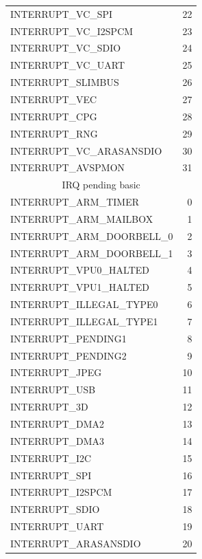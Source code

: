 \documentclass[12pt, svgnames]{book}
\begin{document}
\begin{centering}
{\begin{longtable}{|l | r |}
			 INTERRUPT\_VC\_SPI               &  22\\
			 INTERRUPT\_VC\_I2SPCM            &  23\\
			 INTERRUPT\_VC\_SDIO              &  24\\
			 INTERRUPT\_VC\_UART              &  25\\
			 INTERRUPT\_SLIMBUS              &  26\\
			 INTERRUPT\_VEC                  &  27\\
			 INTERRUPT\_CPG                  &  28\\
			 INTERRUPT\_RNG                  &  29\\
			 INTERRUPT\_VC\_ARASANSDIO        &  30\\
			 INTERRUPT\_AVSPMON              &  31\\
			 \hline
			\multicolumn{2}{|c|}{IRQ pending basic}\\
			\hline
			 INTERRUPT\_ARM\_TIMER            &  0\\
			 INTERRUPT\_ARM\_MAILBOX          &  1\\
			 INTERRUPT\_ARM\_DOORBELL\_0       &  2\\
			 INTERRUPT\_ARM\_DOORBELL\_1       &  3\\
			 INTERRUPT\_VPU0\_HALTED          &  4\\
			 INTERRUPT\_VPU1\_HALTED          &  5\\
			 INTERRUPT\_ILLEGAL\_TYPE0        &  6\\
			 INTERRUPT\_ILLEGAL\_TYPE1        &  7\\
			 INTERRUPT\_PENDING1             &  8\\
			 INTERRUPT\_PENDING2             &  9\\
			 INTERRUPT\_JPEG                 &  10\\
			 INTERRUPT\_USB                  &  11\\
			 INTERRUPT\_3D                   &  12\\
			 INTERRUPT\_DMA2                 &  13\\
			 INTERRUPT\_DMA3                 &  14\\
			 INTERRUPT\_I2C                  &  15\\
			 INTERRUPT\_SPI                  &  16\\
			 INTERRUPT\_I2SPCM               &  17\\
			 INTERRUPT\_SDIO                 &  18\\
			 INTERRUPT\_UART                 &  19\\
			 INTERRUPT\_ARASANSDIO           &  20\\
			\hline
		\end{longtable}
	}
\end{centering}
\end{document}
